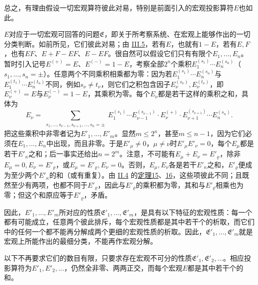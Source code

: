 \documentclass[fontsize=13pt,twoside,openany,headings=normal,parskip=false,bookmarkpackage=false,DIV=calc]{scrbook}
\begin{document}
总之，有理由假设一切宏观算符彼此对易，特别是前面引入的宏观投影算符$E$也如此。

$E$对应于一切宏观可回答的问题$\mathfrak E$，即关于所考察系统、在宏观上能够作出的一切分类判断。如前所见，它们彼此对易；由 \hyperref[sec:III.5]{III.5}，若有$E$，也就有$1-E$，若有$E,\allowbreak F$，也有$EF$、$E+F-EF$、$E-EF$。很自然可以假设它们只有有限个$E_1,\allowbreak \ldots,\allowbreak E_n$。暂时引入记号$E^{(+)}=E$、$E^{(-)}=1-E$，考察全部$2^n$个乘积$E_1^{(s_1)}\cdots E_n^{(s_n)}$（$s_1,\allowbreak \ldots,\allowbreak s_n=\pm$）。任意两个不同乘积相乘都为零：因为若$E_1^{(s_1)}\cdots E_n^{(s_n)}$与$E_1^{(t_1)}\cdots E_n^{(t_n)}$不同，例如$s_\nu\ne t_\nu$，则它们之积包含因子$E_\nu^{(s_\nu)},\allowbreak E_\nu^{(t_\nu)}$，即$E_\nu^{(+)}=E$\hypertarget{origpage-218}{}\label{origpage-218}与$E_\nu^{(-)}=1-E$，其乘积为零。每个$E_\nu$都是若干这样的乘积之和，具体为
\[
E_\nu=\sum_{\substack{s_1,\ldots,s_{\nu-1},s_{\nu+1},\ldots,s_n=\pm}}
 E_1^{(s_1)}\cdots E_{\nu-1}^{(s_{\nu-1})}\cdot E_\nu^{(+)}\cdot E_{\nu+1}^{(s_{\nu+1})}\cdots E_n^{(s_n)}.
\]
把这些乘积中非零者记为$E'_1,\allowbreak \ldots,\allowbreak E'_m$。显然$m\leq2^n$，甚至$m\leq n-1$，因为它们必须在$E_1,\allowbreak \ldots,\allowbreak E_n$中出现，而且非零。于是$E'_\mu\ne0$，$\mu\ne\nu$时$E'_\mu E'_\nu=0$，每个$E_\mu$都是若干$E'_\kappa$之和；后一事实还给出$n=2^m$。注意，不可能有$E_\mu+E_\nu=E'_\varrho$，除非$E_\mu=0,\allowbreak E_\nu=E'_\varrho$，或$E_\mu=E'_\varrho,\allowbreak E_\nu=0$。否则，$E_\mu,\allowbreak E_\nu$各是若干$E'_\kappa$之和，$E'_\varrho$便成为至少两个$E'_\kappa$的和（或有重复）。由 \hyperref[sec:II.4]{II.4} 的\CJKglue \hyperref[thm:II.15]{定理15}、\hyperref[thm:II.16]{16}，这些项彼此不同；且既然至少有两项，也都不同于$E'_\varrho$，因此与$E'_\varrho$的乘积都为零，其和与$E'_\varrho$相乘也为零；但这个和原应等于$E'_\varrho$，矛盾。

因此，$E'_1,\allowbreak \ldots,\allowbreak E'_m$所对应的性质$\mathfrak E'_1,\allowbreak \ldots,\allowbreak \mathfrak E'_m$，是具有以下特征的宏观性质：每一个都有可能成立，任意两个彼此排斥，每个宏观性质都是其中若干个的析取，而它们中的任何一个都不能再分解成两个更细的宏观性质的析取。因此，$\mathfrak E'_1,\allowbreak \ldots,\allowbreak \mathfrak E'_m$就是宏观上所能作出的最细分类，不能再作宏观分解。

以下不再要求它们的数目有限，只要求存在宏观不可分的性质$\mathfrak E'_1,\allowbreak \mathfrak E'_2,\allowbreak \ldots$。相应投影算符为$E'_1,\allowbreak E'_2,\allowbreak \ldots$，仍然全非零、两两正交，而每个宏观$E$都是其中若干个的和。
\end{document}

